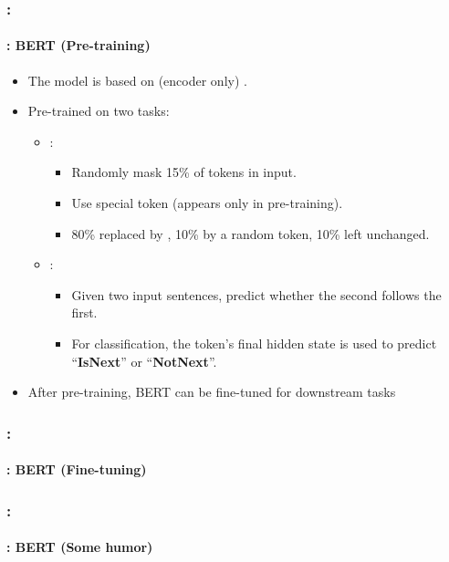 \documentclass[xcolor=table]{beamer}
\begin{document}
\begin{frame}
	\frametitle{\insertshortsubtitle: \insertsection}
	\framesubtitle{\insertsubsection: BERT (Pre-training)}
	
	\begin{itemize}
		\item The model is based on  (encoder only) \cite{2017-vaswani-al}.
		\item Pre-trained on two tasks:
		\begin{itemize}
			\item {}:
			\begin{itemize}
				\item Randomly mask 15\% of tokens in input.
				\item Use special token \keyword{[MASK]} (appears only in pre-training).
				\item 80\% replaced by \keyword{[MASK]}, 10\% by a random token, 10\% left unchanged.
			\end{itemize}
			\item {}:
			\begin{itemize}
				\item Given two input sentences, predict whether the second follows the first.
				\item For classification, the \keyword{[CLS]} token's final hidden state is used to predict ``\textbf{IsNext}'' or ``\textbf{NotNext}''.
			\end{itemize}
		\end{itemize}
		\item After pre-training, BERT can be fine-tuned for downstream tasks
	\end{itemize}
	
\end{frame}


\begin{frame}
	\frametitle{\insertshortsubtitle: \insertsection}
	\framesubtitle{\insertsubsection: BERT (Fine-tuning)}

	\begin{center}
	\end{center}
	
\end{frame}

\begin{frame}
	\frametitle{\insertshortsubtitle: \insertsection}
	\framesubtitle{\insertsubsection: BERT (Some humor)}

	\begin{center}
	\end{center}
	
\end{frame}
\end{document}
